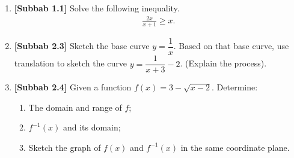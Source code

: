 \documentclass[10pt,openany,a4paper]{article}
\theoremstyle{definition}
\theoremstyle{definition}
\theoremstyle{plain}
\begin{document}
\newpage

\begin{enumerate}
    \item \textbf{[Subbab 1.1]} Solve the following inequality.
    \begin{align*}
        \frac{2x}{x+1}\geq x.
    \end{align*}

    \item \textbf{[Subbab 2.3]} Sketch the base curve $y=\dfrac{1}{x}$. Based on that base curve, use translation to sketch the curve $y=\dfrac{1}{x+3}-2$. (Explain the process).

    \item \textbf{[Subbab 2.4]} Given a function $f(x)=3-\sqrt{x-2}$. Determine:
    \begin{enumerate}
        \item[a)] The domain and range of $f$;
        \item[b)] $f^{-1}(x)$ and its domain;
        \item[c)] Sketch the graph of $f(x)$ and $f^{-1}(x)$ in the same coordinate plane.
    \end{enumerate}


\end{enumerate}
\end{document}
